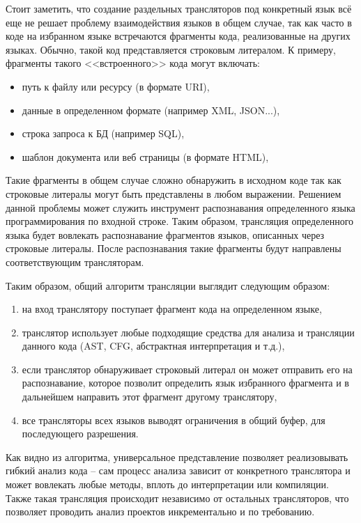 Стоит заметить, что создание раздельных трансляторов под конкретный язык всё еще не решает проблему
взаимодействия языков в общем случае, так как часто в коде на избранном языке встречаются фрагменты
кода, реализованные на других языках. Обычно, такой код представляется строковым литералом. К примеру,
фрагменты такого <<встроенного>> кода могут включать:
\begin{itemize}
    \item путь к файлу или ресурсу (в формате URI),
    \item данные в определенном формате (например XML, JSON...),
    \item строка запроса к БД (например SQL),
    \item шаблон документа или веб страницы (в формате HTML),
\end{itemize}

Такие фрагменты в общем случае сложно обнаружить в исходном коде так как строковые литералы
могут быть представлены в любом выражении. Решением данной проблемы может служить инструмент
распознавания определенного языка программирования по входной строке. Таким образом,
трансляция определенного языка будет вовлекать распознавание фрагментов языков, описанных через строковые литералы.
После распознавания такие фрагменты будут направлены соответствующим трансляторам.

Таким образом, общий алгоритм трансляции выглядит следующим образом:
\begin{enumerate}[1)]
    \item на вход транслятору поступает фрагмент кода на определенном языке,
    \item транслятор использует любые подходящие средства для анализа и трансляции данного кода
    (AST, CFG, абстрактная интерпретация и т.д.),
    \item если транслятор обнаруживает строковый литерал он может отправить его на распознавание, которое
    позволит определить язык избранного фрагмента и в дальнейшем направить этот фрагмент другому транслятору,
    \item все трансляторы всех языков выводят ограничения в общий буфер, для последующего разрешения.
\end{enumerate}

Как видно из алгоритма, универсальное представление позволяет реализовывать гибкий анализ кода --
сам процесс анализа зависит от конкретного транслятора и может вовлекать любые методы, вплоть до интерпретации
или компиляции. Также такая трансляция происходит независимо от остальных трансляторов, что
позволяет проводить анализ проектов инкрементально и по требованию.

